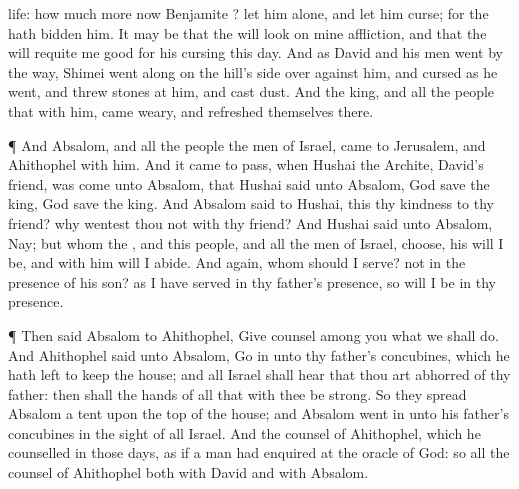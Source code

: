 {life: how much more now
{}
Benjamite
{}? let him
alone, and let him
curse; for the
{} hath
bidden him.
It may be that the
{} will
look on mine
affliction, and that the
{} will
requite me
good for his
cursing this
day.
And as
David and his
men
went by the
way,
Shimei went
along on the
hill’s
side over
against him, and
cursed as he
went, and
threw
stones
at him, and
cast
dust.
And the
king, and all the
people that
{} with him,
came
weary, and
refreshed themselves there.
\par }{\PP {}¶ And
Absalom, and all the
people the
men of
Israel,
came to
Jerusalem, and
Ahithophel with him.
And it came to pass, when
Hushai the
Archite,
David’s
friend, was
come unto
Absalom, that
Hushai
said unto
Absalom, God
save the
king, God
save the
king.
And
Absalom
said to
Hushai,
{} this thy
kindness to thy
friend? why
wentest thou not with thy
friend?
And
Hushai
said unto
Absalom, Nay; but whom the
{}, and this
people, and all the
men of
Israel,
choose, his will I be, and with him will I
abide.
And
again, whom should I
serve?
{} not
{} in the
presence of his
son? as I have
served in thy
father’s
presence, so will I be in thy
presence.
\par }{\PP {}¶ Then
said
Absalom to
Ahithophel,
Give
counsel among you what we shall
do.
And
Ahithophel
said unto
Absalom, Go
in unto thy
father’s
concubines, which he hath
left to
keep the
house; and all
Israel shall
hear that thou art
abhorred of thy
father: then shall the
hands of all that
{} with thee be
strong.
So they
spread
Absalom a
tent upon the top of the
house; and
Absalom went
in unto his
father’s
concubines in the
sight of all
Israel.
And the
counsel of
Ahithophel, which he
counselled in those
days,
{} as if a
man had
enquired at the
oracle of
God: so
{} all the
counsel of
Ahithophel both with
David and with
Absalom.

}
